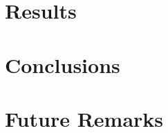 \documentclass{article} %
\begin{document}
\section{Results}

\section{Conclusions}

\section{Future Remarks}



\end{document}
